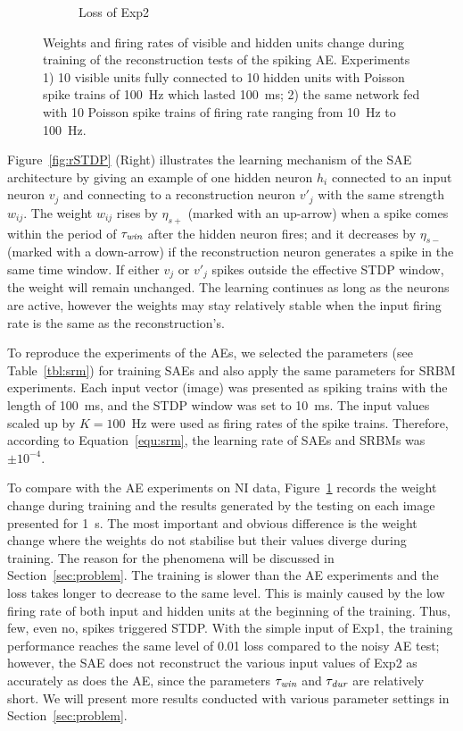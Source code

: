 \begin{figure}
\begin{subfigure}[t]{0.48\textwidth}
		\caption{Loss of Exp2}
	\end{subfigure}
	\caption[SAE training of the reconstruction tests.]{Weights and firing rates of visible and hidden units change during training of the reconstruction tests of the spiking AE. 
		Experiments 1) 10 visible units fully connected to 10 hidden units with Poisson spike trains of 100~Hz which lasted 100~ms; 2) the same network fed with 10 Poisson spike trains of firing rate ranging from 10~Hz to 100~Hz.}
	\label{fig:SAE_orig}
\end{figure}

Figure~\ref{fig:rSTDP} (Right) illustrates the learning mechanism of the SAE architecture by giving an example of one hidden neuron $h_i$ connected to an input neuron $v_j$ and connecting to a reconstruction neuron $v'_j$ with the same strength $w_{ij}$.
The weight $w_{ij}$ rises by $\eta_{s+}$ (marked with an up-arrow) when a spike comes within the period of $\tau_{\textit{\textrm{win}}}$ after the hidden neuron fires;
and it decreases by $\eta_{s-}$ (marked with a down-arrow) if the reconstruction neuron generates a spike in the same time window.
If either $v_j$ or $v'_j$ spikes outside the effective STDP window, the weight will remain unchanged.
The learning continues as long as the neurons are active, however the weights may stay relatively stable when the input firing rate is the same as the reconstruction's.

To reproduce the experiments of the AEs, we selected the parameters (see Table~\ref{tbl:srm}) for training SAEs and also apply the same parameters for SRBM experiments.
Each input vector (image) was presented as spiking trains with the length of 100~ms, and the STDP window was set to 10~ms.
The input values scaled up by $K=100$~Hz were used as firing rates of the spike trains.
Therefore, according to Equation~\ref{equ:srm}, the learning rate of SAEs and SRBMs was $\pm 10^{-4}$.

To compare with the AE experiments on NI data, Figure~\ref{fig:SAE_orig} records the weight change during training and the results generated by the testing on each image presented for 1~s.
The most important and obvious difference is the weight change where the weights do not stabilise but their values diverge during training.
The reason for the phenomena will be discussed in Section~\ref{sec:problem}.
The training is slower than the AE experiments and the loss takes longer to decrease to the same level.
This is mainly caused by the low firing rate of both input and hidden units at the beginning of the training.
Thus, few, even no, spikes triggered STDP.
With the simple input of Exp1, the training performance reaches the same level of 0.01 loss compared to the noisy AE test;
however, the SAE does not reconstruct the various input values of Exp2 as accurately as does the AE, since the parameters $\tau_{\textit{\textrm{win}}}$ and $\tau_{\textit{\textrm{dur}}}$ are relatively short.
We will present more results conducted with various parameter settings in Section~\ref{sec:problem}.


